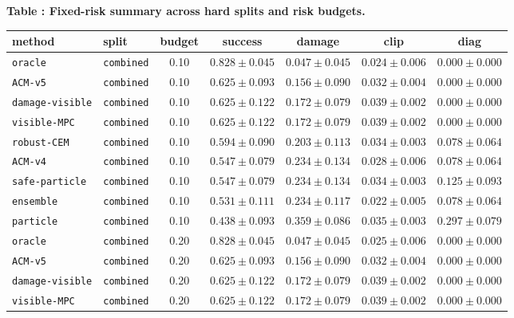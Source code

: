 \documentclass{article}
\begin{document}
\scriptsize
\setlength{\tabcolsep}{2pt}
\begin{center}
\label{tab:fixed}\textbf{Table \thetable: Fixed-risk summary across hard splits and risk budgets.}\\[0.4ex]
\begin{tabular}{llccccc}
\toprule
method & split & budget & success & damage & clip & diag \\
\midrule
\texttt{oracle} & \texttt{combined} & 0.10 & $0.828 \pm 0.045$ & $0.047 \pm 0.045$ & $0.024 \pm 0.006$ & $0.000 \pm 0.000$ \\
\texttt{ACM-v5} & \texttt{combined} & 0.10 & $0.625 \pm 0.093$ & $0.156 \pm 0.090$ & $0.032 \pm 0.004$ & $0.000 \pm 0.000$ \\
\texttt{damage-visible} & \texttt{combined} & 0.10 & $0.625 \pm 0.122$ & $0.172 \pm 0.079$ & $0.039 \pm 0.002$ & $0.000 \pm 0.000$ \\
\texttt{visible-MPC} & \texttt{combined} & 0.10 & $0.625 \pm 0.122$ & $0.172 \pm 0.079$ & $0.039 \pm 0.002$ & $0.000 \pm 0.000$ \\
\texttt{robust-CEM} & \texttt{combined} & 0.10 & $0.594 \pm 0.090$ & $0.203 \pm 0.113$ & $0.034 \pm 0.003$ & $0.078 \pm 0.064$ \\
\texttt{ACM-v4} & \texttt{combined} & 0.10 & $0.547 \pm 0.079$ & $0.234 \pm 0.134$ & $0.028 \pm 0.006$ & $0.078 \pm 0.064$ \\
\texttt{safe-particle} & \texttt{combined} & 0.10 & $0.547 \pm 0.079$ & $0.234 \pm 0.134$ & $0.034 \pm 0.003$ & $0.125 \pm 0.093$ \\
\texttt{ensemble} & \texttt{combined} & 0.10 & $0.531 \pm 0.111$ & $0.234 \pm 0.117$ & $0.022 \pm 0.005$ & $0.078 \pm 0.064$ \\
\texttt{particle} & \texttt{combined} & 0.10 & $0.438 \pm 0.093$ & $0.359 \pm 0.086$ & $0.035 \pm 0.003$ & $0.297 \pm 0.079$ \\
\texttt{oracle} & \texttt{combined} & 0.20 & $0.828 \pm 0.045$ & $0.047 \pm 0.045$ & $0.025 \pm 0.006$ & $0.000 \pm 0.000$ \\
\texttt{ACM-v5} & \texttt{combined} & 0.20 & $0.625 \pm 0.093$ & $0.156 \pm 0.090$ & $0.032 \pm 0.004$ & $0.000 \pm 0.000$ \\
\texttt{damage-visible} & \texttt{combined} & 0.20 & $0.625 \pm 0.122$ & $0.172 \pm 0.079$ & $0.039 \pm 0.002$ & $0.000 \pm 0.000$ \\
\texttt{visible-MPC} & \texttt{combined} & 0.20 & $0.625 \pm 0.122$ & $0.172 \pm 0.079$ & $0.039 \pm 0.002$ & $0.000 \pm 0.000$ \\

\end{tabular}
\end{center}
\end{document}
